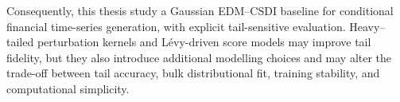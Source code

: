 Consequently, this thesis study a Gaussian EDM--CSDI baseline for conditional financial time-series generation, with explicit tail-sensitive evaluation. Heavy--tailed perturbation kernels and L\'evy-driven score models may improve tail fidelity, but they also introduce additional modelling choices and may alter the trade-off between tail accuracy, bulk distributional fit, training stability, and computational simplicity.




